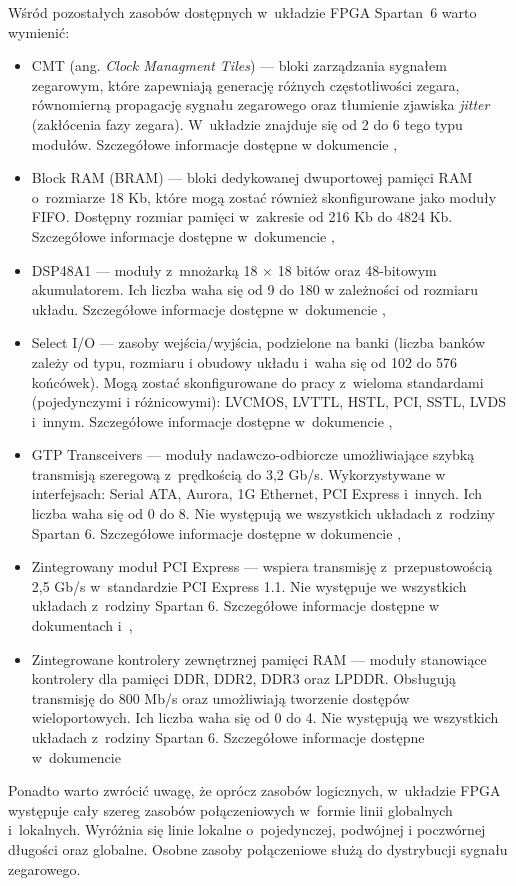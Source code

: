 Wśród pozostałych zasobów dostępnych w~układzie FPGA Spartan~6 warto wymienić:
\begin{itemize}
\item {CMT} (ang. \textit{Clock Managment Tiles}) --- bloki zarządzania sygnałem zegarowym, które zapewniają generację różnych częstotliwości zegara, równomierną propagację sygnału zegarowego oraz tłumienie zjawiska \textit{jitter} (zakłócenia fazy zegara). W~układzie znajduje się od 2 do 6 tego typu modułów. Szczegółowe informacje dostępne w dokumencie \cite{xilix_sp6ugCLK},
\item Block RAM (BRAM) --- bloki dedykowanej dwuportowej pamięci RAM o~rozmiarze 18 Kb, które mogą zostać również skonfigurowane jako moduły FIFO. Dostępny rozmiar pamięci w~zakresie od 216 Kb do 4824 Kb.  Szczegółowe informacje dostępne w~dokumencie \cite{xilix_sp6ugBRAM},
\item DSP48A1 --- moduły z~mnożarką 18 $\times$ 18 bitów oraz 48-bitowym akumulatorem. Ich liczba waha się od 9 do 180 w zależności od rozmiaru układu. Szczegółowe informacje dostępne w~dokumencie \cite{xilix_sp6ugDSP},  
\item Select I/O --- zasoby wejścia/wyjścia, podzielone na banki (liczba banków zależy od typu, rozmiaru i obudowy układu i~waha się od 102 do 576 końcówek). Mogą zostać skonfigurowane do pracy z~wieloma standardami (pojedynczymi i różnicowymi): LVCMOS, LVTTL, HSTL, PCI, SSTL, LVDS i~innym. Szczegółowe informacje dostępne w~dokumencie \cite{xilix_sp6ugIO},
\item GTP Transceivers --- moduły nadawczo-odbiorcze umożliwiające szybką transmisją szeregową z~prędkością do 3,2 Gb/s. Wykorzystywane w interfejsach: Serial ATA, Aurora, 1G Ethernet, PCI Express i~innych. Ich liczba waha się od 0 do 8. Nie występują we wszystkich układach z~rodziny Spartan 6. Szczegółowe informacje dostępne w dokumencie \cite{xilix_sp6ugGTP},
\item Zintegrowany moduł PCI Express --- wspiera transmisję z~przepustowością 2,5 Gb/s w~standardzie PCI Express 1.1. Nie występuje we wszystkich układach z~rodziny Spartan 6. Szczegółowe informacje dostępne w dokumentach \cite{xilix_sp6ugPCI} i~\cite{xilix_sp6ugPCIAXI},
\item Zintegrowane kontrolery zewnętrznej pamięci RAM --- moduły stanowiące kontrolery dla pamięci DDR, DDR2, DDR3 oraz LPDDR. Obsługują transmisję do 800 Mb/s oraz umożliwiają tworzenie dostępów wieloportowych. Ich liczba waha się od 0 do 4. Nie występują we wszystkich układach z~rodziny Spartan 6. Szczegółowe informacje dostępne w~dokumencie \cite{xilix_sp6ugRAM}  
\end{itemize}

Ponadto warto zwrócić uwagę, że oprócz zasobów logicznych, w~układzie FPGA występuje cały szereg zasobów połączeniowych w~formie linii globalnych i~lokalnych. 
Wyróżnia się linie lokalne o~pojedynczej, podwójnej i poczwórnej długości oraz globalne.
Osobne zasoby połączeniowe służą do dystrybucji sygnału zegarowego.




